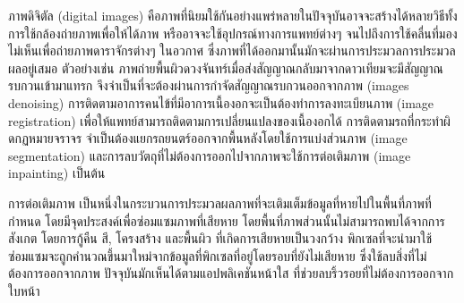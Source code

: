 \documentclass[hidelinks,a4paper,14pt]{article}
\numberwithin{equation}{section}							%
\begin{document}
{%
	
	
	
	
	
	ภาพดิจิตัล (digital images)  คือภาพที่นิยมใช้กันอย่างแพร่หลายในปัจจุบันอาจจะสร้างได้หลายวิธีทั้งการใช้กล้องถ่ายภาพเพื่อให้ได้ภาพ หรืออาจจะใช้อุปกรณ์ทางการแพทย์ต่างๆ จนไปถึงการใช้คลื่นที่มองไม่เห็นเพื่อถ่ายภาพดาราจักรต่างๆ ในอวกาศ  ซึ่งภาพที่ได้ออกมานั้นมักจะผ่านการประมวลการประมวลผลอยู่เสมอ ตัวอย่างเช่น ภาพถ่ายพื้นผิวดวงจันทร์เมื่อส่งสัญญาณกลับมาจากดาวเทียมจะมีสัญญาณรบกวนเข้ามาแทรก จึงจำเป็นที่จะต้องผ่านการกำจัดสัญญาณรบกวนออกจากภาพ (images denoising) การติดตามอาการคนไข้ที่มีอาการเนื้องอกจะเป็นต้องทำการลงทะเบียนภาพ (image registration) เพื่อให้แพทย์สามารถติดตามการเปลี่ยนแปลงของเนื้องอกได้ การติดตามรถที่กระทำผิดกฏหมายจราจร จำเป็นต้องแยกรถยนตร์ออกจากพื้นหลังโดยใช้การแบ่งส่วนภาพ (image segmentation) และการลบวัตถุที่ไม่ต้องการออกไปจากภาพจะใช้การต่อเติมภาพ (image inpainting) เป็นต้น 
	
	
	การต่อเติมภาพ เป็นหนึ่งในกระบวนการประมวลผลภาพที่จะเติมเต็มข้อมูลที่หายไปในพื้นที่ภาพที่กำหนด โดยมีจุดประสงค์เพื่อซ่อมแซมภาพที่เสียหาย โดยพื้นที่ภาพส่วนนั้นไม่สามารถพบได้จากการสังเกต โดยการกู้คืน สี, โครงสร้าง และพื้นผิว ที่เกิดการเสียหายเป็นวงกว้าง พิกเซลที่จะนำมาใช้ซ่อมแซมจะถูกคำนวณขึ้นมาใหม่จากข้อมูลที่พิกเซลที่อยู่โดยรอบที่ยังไม่เสียหาย \cite{ref:defination-of-inpaint}  ซึ่งใช้ลบสิ่งที่ไม่ต้องการออกจากภาพ ปัจจุบันมักเห็นได้ตามแอปพลิเคชันหน้าใส ที่ช่วยลบริ้วรอยที่ไม่ต้องการออกจากใบหน้า
	
		
}
\end{document}
